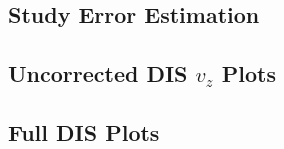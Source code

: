 \subsection*{Study Error Estimation}


\subsection*{Uncorrected DIS $v_z$ Plots}


\subsection*{Full DIS Plots}


